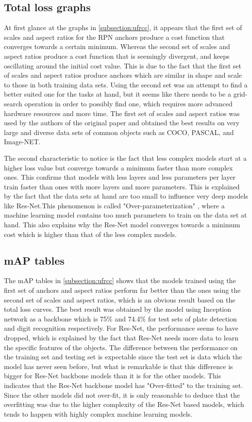 \subsection{Total loss graphs}
At first glance at the graphs in \cref{subsection:ufrcc}, it appears that the first set of scales and aspect ratios for the RPN anchors produce a cost function that converges towards a certain minimum. Whereas the second set of scales and aspect ratios produce a cost function that is seemingly divergent, and keeps oscillating around the initial cost value. This is due to the fact that the first set of scales and aspect ratios produce anchors which are similar in shape and scale to those in both training data sets. Using the second set was an attempt to find a better suited one for the tasks at hand, but it seems like there needs to be a grid-search\cite{b15} operation in order to possibly find one, which requires more advanced hardware resources and more time. The first set of scales and aspect ratios was used by the authors of the original paper and obtained the best results on very large and diverse data sets of common objects such as COCO\cite{b18}, PASCAL\cite{b19}, and Image-NET\cite{b20}.

The second characteristic to notice is the fact that less complex models start at a higher loss value but converge towards a minimum faster than more complex ones. This confirms that models with less layers and less parameters per layer train faster than ones with more layers and more parameters. This is explained by the fact that the data sets at hand are too small to influence very deep models like Res-Net.This phenomenon is called "Over-parameterization" \cite{b16}, where a machine learning model contains too much parameters to train on the data set at hand. This also explains why the Res-Net model converges towards a minimum cost which is higher than that of the less complex models.

\subsection{mAP tables}
The mAP tables in \cref{subsection:ufrcc} shows that the models trained using the first set of anchors and aspect ratios perform far better than the ones using the second set of scales and aspect ratios, which is an obvious result based on the total loss curves. The best result was obtained by the model using Inception network as a backbone which is 75\% and 74.4\% for test sets of plate detection and digit recognition respectively. For Res-Net, the performance seems to have dropped, which is explained by the fact that Res-Net needs more data to learn the specific features of the objects. The difference between the performance on the training set and testing set is expectable since the test set is data which the model has never seen before, but what is remarkable is that this difference is bigger for Res-Net backbone models than it is for the other models. This indicates that the Res-Net backbone model has "Over-fitted"\cite{b15} to the training set. Since the other models did not over-fit, it is only reasonable to deduce that the overfitting was due to the higher complexity of the Res-Net based models, which tends to happen with highly complex machine learning models.

